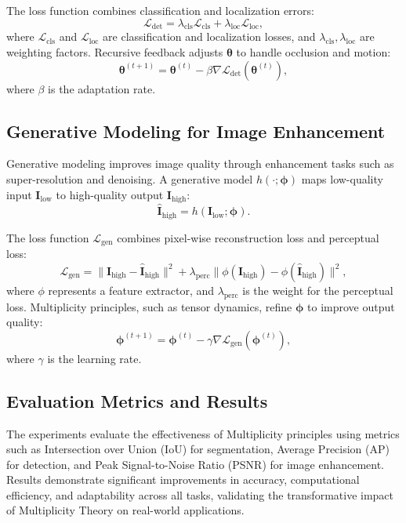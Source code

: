\documentclass{article}
\theoremstyle{plain}
\begin{document}
The loss function combines classification and localization errors:
\begin{equation}
\mathcal{L}_{\text{det}} = \lambda_{\text{cls}} \mathcal{L}_{\text{cls}} + \lambda_{\text{loc}} \mathcal{L}_{\text{loc}},
\end{equation}
where \( \mathcal{L}_{\text{cls}} \) and \( \mathcal{L}_{\text{loc}} \) are classification and localization losses, and \( \lambda_{\text{cls}}, \lambda_{\text{loc}} \) are weighting factors. Recursive feedback adjusts \( \mathbf{\theta} \) to handle occlusion and motion:
\begin{equation}
\mathbf{\theta}^{(t+1)} = \mathbf{\theta}^{(t)} - \beta \nabla \mathcal{L}_{\text{det}}(\mathbf{\theta}^{(t)}),
\end{equation}
where \( \beta \) is the adaptation rate.

\subsection{Generative Modeling for Image Enhancement}
Generative modeling improves image quality through enhancement tasks such as super-resolution and denoising. A generative model \( h(\cdot; \mathbf{\phi}) \) maps low-quality input \( \mathbf{I}_{\text{low}} \) to high-quality output \( \mathbf{I}_{\text{high}} \):
\begin{equation}
\hat{\mathbf{I}}_{\text{high}} = h(\mathbf{I}_{\text{low}}; \mathbf{\phi}).
\end{equation}

The loss function \( \mathcal{L}_{\text{gen}} \) combines pixel-wise reconstruction loss and perceptual loss:
\begin{equation}
\mathcal{L}_{\text{gen}} = \|\mathbf{I}_{\text{high}} - \hat{\mathbf{I}}_{\text{high}}\|^2 + \lambda_{\text{perc}} \|\phi(\mathbf{I}_{\text{high}}) - \phi(\hat{\mathbf{I}}_{\text{high}})\|^2,
\end{equation}
where \( \phi \) represents a feature extractor, and \( \lambda_{\text{perc}} \) is the weight for the perceptual loss. Multiplicity principles, such as tensor dynamics, refine \( \mathbf{\phi} \) to improve output quality:
\begin{equation}
\mathbf{\phi}^{(t+1)} = \mathbf{\phi}^{(t)} - \gamma \nabla \mathcal{L}_{\text{gen}}(\mathbf{\phi}^{(t)}),
\end{equation}
where \( \gamma \) is the learning rate.

\subsection{Evaluation Metrics and Results}
The experiments evaluate the effectiveness of Multiplicity principles using metrics such as Intersection over Union (IoU) for segmentation, Average Precision (AP) for detection, and Peak Signal-to-Noise Ratio (PSNR) for image enhancement. Results demonstrate significant improvements in accuracy, computational efficiency, and adaptability across all tasks, validating the transformative impact of Multiplicity Theory on real-world applications.
\end{document}
